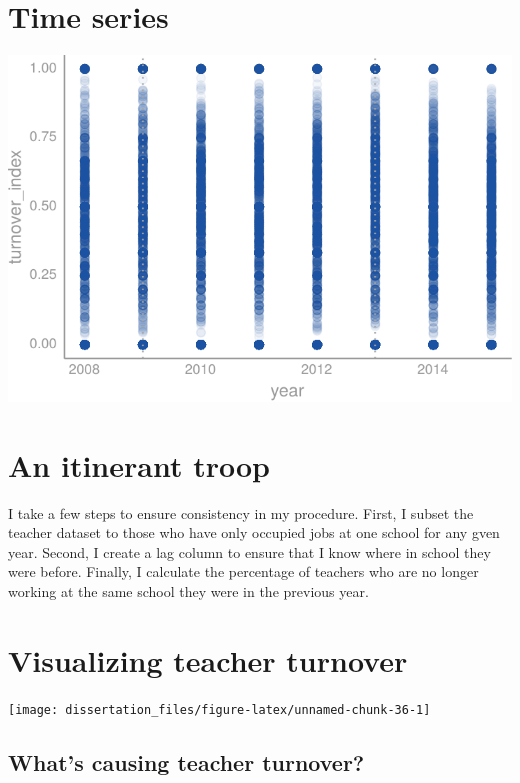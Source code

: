 \documentclass[12pt,]{article}
\begin{document}
\hypertarget{time-series}{%
\section{Time series}\label{time-series}}

\begin{center}\includegraphics{dissertation_files/figure-latex/unnamed-chunk-35-1} \end{center}

\hypertarget{an-itinerant-troop}{%
\section{An itinerant troop}\label{an-itinerant-troop}}

I take a few steps to ensure consistency in my procedure. First, I
subset the teacher dataset to those who have only occupied jobs at one
school for any gven year. Second, I create a lag column to ensure that I
know where in school they were before. Finally, I calculate the
percentage of teachers who are no longer working at the same school they
were in the previous year.

\hypertarget{visualizing-teacher-turnover}{%
\section{Visualizing teacher
turnover}\label{visualizing-teacher-turnover}}

\begin{center}\texttt{[image: dissertation\_files/figure-latex/unnamed-chunk-36-1]} \end{center}

\hypertarget{whats-causing-teacher-turnover}{%
\subsection{What's causing teacher
turnover?}\label{whats-causing-teacher-turnover}}
\end{document}
